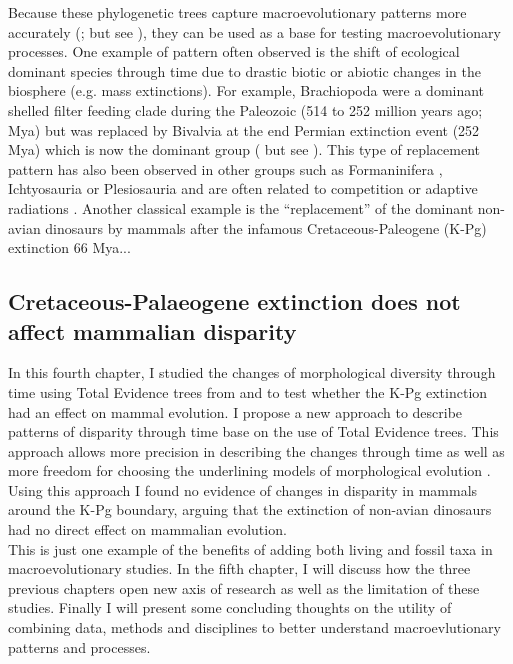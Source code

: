Because these phylogenetic trees capture macroevolutionary patterns more accurately (\citealt{ronquista2012,schragocombining2013,slaterphylogenetic2013,beckancient2014,Dembo2015}; but see \citealt{Arcila2015131}), they can be used as a base for testing macroevolutionary processes.
One example of pattern often observed is the shift of ecological dominant species through time due to drastic biotic or abiotic changes in the biosphere (e.g. mass extinctions).
For example, Brachiopoda were a dominant shelled filter feeding clade during the Paleozoic (514 to 252 million years ago; Mya) but was replaced by Bivalvia at the end Permian extinction event (252 Mya) which is now the dominant group (\citealt{Sepkiski1981,CLAPHAM01102006} but see \citealt{Payne22052014}).
This type of replacement pattern has also been observed in other groups such as Formaninifera \citep{Coxall01042006}, Ichtyosauria \citep{thorneresetting2011} or Plesiosauria \citealt{bensonfaunal2014} and are often related to competition \citep{brusatte50} or adaptive radiations \citep{Losos2010}.
Another classical example is the ``replacement'' of the dominant non-avian dinosaurs by mammals after the infamous Cretaceous-Paleogene (K-Pg) extinction 66 Mya...

\subsection{Cretaceous-Palaeogene extinction does not affect mammalian disparity}
In this fourth chapter, I studied the changes of morphological diversity \citep[or disparity;][]{Wills1994} through time using Total Evidence trees from \cite{slaterphylogenetic2013} and \cite{beckancient2014} to test whether the K-Pg extinction had an effect on mammal evolution.
I propose a new approach to describe patterns of disparity through time base on the use of Total Evidence trees.
This approach allows more precision in describing the changes through time as well as more freedom for choosing the underlining models of morphological evolution \citep[e.g. punctuated or gradual;][]{Hunt21042015}.
Using this approach I found no evidence of changes in disparity in mammals around the K-Pg boundary, arguing that the extinction of non-avian dinosaurs had no direct effect on mammalian evolution.\\

This is just one example of the benefits of adding both living and fossil taxa in macroevolutionary studies.
In the fifth chapter, I will discuss how the three previous chapters open new axis of research %
as well as the limitation of these studies.
Finally I will present some concluding thoughts on the utility of combining data, methods and disciplines to better understand macroevlutionary patterns and processes.

